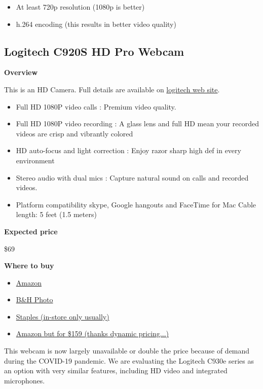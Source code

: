 \begin{itemize}
	\item At least 720p resolution (1080p is better)
	\item h.264 encoding (this results in better video quality)
\end{itemize}

\subsection{Logitech C920S HD Pro Webcam}
\label{sec:equipment::logitech-920}

\begin{gram}
\label{grm:equipment::logitech-920::main}
\textbf{Overview}

This is an HD Camera.  Full details are available on 
%
\href{https://www.logitech.com/en-us/product/hd-pro-webcam-c920s}{logitech web site}.
%
\begin{itemize}
\item
Full HD 1080P video calls : Premium video quality.
\item
Full HD 1080P video recording : A glass lens and full HD mean your recorded videos are crisp and vibrantly colored
\item
HD auto-focus and light correction : Enjoy razor sharp high def in every environment

\item
Stereo audio with dual mics : Capture natural sound on calls and recorded videos. 

\item 
Platform compatibility skype, Google hangouts and FaceTime for Mac
Cable length: 5 feet (1.5 meters)
\end{itemize}


\textbf{Expected price}

\$69

\textbf{Where to buy}

\begin{itemize}
\item
\href{https://www.amazon.com/Logitech-Widescreen-Calling-Recording-Desktop/dp/B006JH8T3S/ref=sr_1_2?crid=2T6CQ3HNRR1XR&keywords=logitech+c920&qid=1582900645&s=electronics&sprefix=logitech+c,electronics,172&sr=1-2}{Amazon}
\item
\href{https://www.bhphotovideo.com/c/product/1461727-REG/logitech_960_001257_c920s_hd_pro_webcam.html}{B\&H Photo}
\item
\href{https://www.staples.com/logitech-c920s-pro-hd-webcam/product_24383955}{Staples (in-store only usually)}
\item
\href{https://www.amazon.com/Logitech-C920-Pro-Webcam-Black/dp/B00829D0GM/ref=sr_1_3?dchild=1&keywords=Logitech+C920+HD+Pro+Webcam&qid=1597029767&sr=8-3}{Amazon but for \$159 (thanks dynamic pricing...)}
\end{itemize}

This webcam is now largely unavailable or double the price because of demand during the
COVID-19 pandemic. We are evaluating the Logitech C930e series as an
option with very similar features, including HD video and integrated
microphones.
\end{gram}

